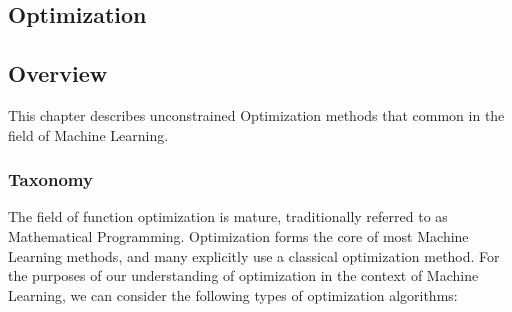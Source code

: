 

\renewcommand{\bibsection}{\subsection{\bibname}}
\begin{bibunit}

\chapter{Optimization}
\label{ch:optimization}

\section{Overview}
This chapter describes unconstrained Optimization methods that common in the field of Machine Learning.

\subsection{Taxonomy}
The field of function optimization is mature, traditionally referred to as Mathematical Programming. Optimization forms the core of most Machine Learning methods, and many explicitly use a classical optimization method. For the purposes of our understanding of optimization in the context of Machine Learning, we can consider the following types of optimization algorithms:


\end{bibunit}
